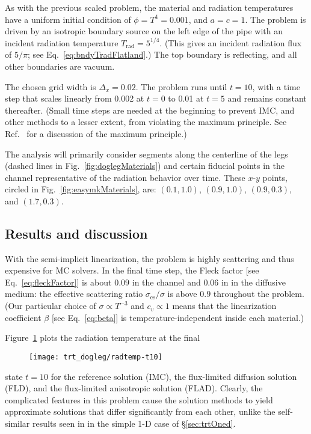 As with the previous scaled problem, the material and radiation temperatures
have a uniform initial condition of $\phi = T^4 = 0.001$, and $a=c=1$. The
problem is driven by an isotropic boundary source on the left edge of the pipe
with an incident radiation temperature $T_\text{rad} = 5^{1/4}$. (This gives
an incident radiation flux of $5/\pi$; see Eq.~\eqref{eq:bndyTradFlatland}.)
The top boundary is reflecting, and all other boundaries are vacuum.

The chosen grid width is $\Delta_x = 0.02$. The problem runs until $t=10$, with
a time step that scales linearly from 0.002 at $t=0$ to 0.01 at $t=5$ and
remains constant thereafter. (Small time steps are needed at the beginning to
prevent IMC, and other methods to a lesser extent, from violating the maximum
principle. See Ref.~\cite{Lar1987} for a discussion of the maximum principle.)

The analysis will primarily consider segments along the centerline of the legs
(dashed lines
in Fig.~\ref{fig:doglegMaterials}) and certain fiducial points in the channel
representative of the radiation behavior over time. These $x$-$y$ points,
circled in Fig.~\ref{fig:easymkMaterials}, are: $(0.1, 1.0)$, $(0.9, 1.0)$,
$(0.9, 0.3)$, and $(1.7, 0.3)$.

\subsection{Results and discussion}

With the semi-implicit linearization, the problem is highly scattering and
thus expensive for MC solvers. In the
final time step, the Fleck factor [see Eq.~\eqref{eq:fleckFactor}] is about
$0.09$ in the channel and $0.06$ in in the diffusive medium: the effective
scattering ratio $\sigma_\text{es}/\sigma$ is above $0.9$ throughout the
problem. (Our particular choice of $\sigma \propto T^{-3}$ and $c_v \propto 1$
means that the linearization coefficient $\beta$ [see Eq.~\eqref{eq:beta}] is
temperature-independent inside each material.)

Figure~\ref{fig:doglegRadtempFinal} plots the radiation temperature at the final
%
\begin{figure}[htb]
  \centering
  \texttt{[image: trt\_dogleg/radtemp-t10]}
  \label{fig:doglegRadtempFinal}
\end{figure}
%
state $t=10$ for the reference solution (IMC), the flux-limited diffusion
solution (FLD), and the flux-limited anisotropic solution (FLAD). Clearly, the
complicated features in this problem cause the solution
methods to yield approximate solutions that differ significantly from each
other, unlike the self-similar results seen in in the simple 1-D case of
\S\ref{sec:trtOned}.

